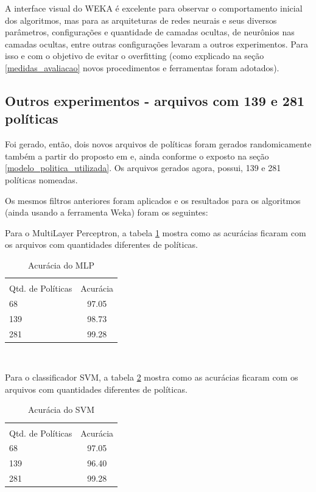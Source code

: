 A interface visual do WEKA é excelente para observar o comportamento inicial dos algoritmos, mas para as arquiteturas de redes neurais e seus diversos parâmetros, configurações e quantidade de camadas ocultas, de neurônios nas camadas ocultas, entre outras configurações levaram a outros experimentos. Para isso e com o objetivo de evitar o overfitting (como explicado na seção \ref{medidas_avaliacao} novos procedimentos e ferramentas foram adotados).

\subsection{Outros experimentos - arquivos com 139 e 281 políticas}
Foi gerado, então, dois novos arquivos de políticas foram gerados randomicamente também a partir do proposto em \cite{sarkis2017} e, ainda conforme o exposto na seção \ref{modelo_politica_utilizada}. Os arquivos gerados agora, possui, 139  e 281 políticas nomeadas.

Os mesmos filtros anteriores foram aplicados e os resultados para os algoritmos (ainda usando a ferramenta Weka) foram os seguintes:

Para o MultiLayer Perceptron, a tabela \ref{tab:MLP_acuracia} mostra como as acurácias ficaram com os arquivos com quantidades diferentes de políticas.

\begin{table}[h!]
	\centering
	\caption{Acurácia do MLP}
	\label{tab:MLP_acuracia}
	\vspace{0.3cm}
	\begin{tabular}{p{6cm}c}
		\hline\\
		Qtd. de Políticas	& Acurácia  \\[10pt] 
		\hline
		68 					& 97.05    	\\
		139			     	& 98.73     \\
		281					& 99.28		\\
		\hline
	\end{tabular}
	\\[6pt]		
\end{table}

Para o classificador SVM, a tabela \ref{tab:SVM_acuracia} mostra como as acurácias ficaram com os arquivos com quantidades diferentes de políticas.

\begin{table}[h!]
	\centering
	\caption{Acurácia do SVM}
	\label{tab:SVM_acuracia}
	\vspace{0.3cm}
	\begin{tabular}{p{6cm}c}
		\hline\\
		Qtd. de Políticas	& Acurácia  \\[10pt] 
		\hline
		68 					& 97.05    	\\
		139			     	& 96.40     \\
		281					& 99.28		\\
		\hline
	\end{tabular}
	\\[6pt]		
\end{table}

